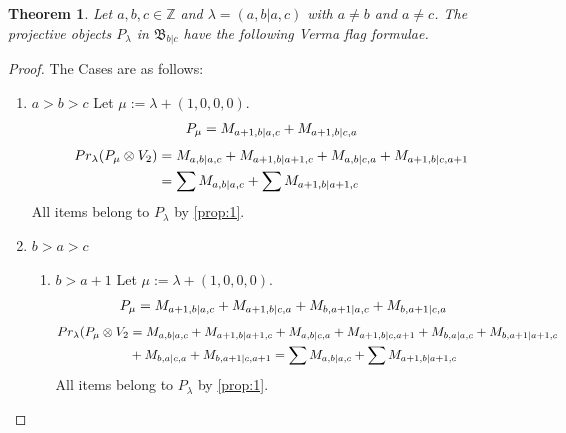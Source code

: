 \documentclass[12pt,a4paper]{article}
\newtheorem{theorem}{Theorem}[section]
\begin{document}
\begin{theorem}
  Let $a,b,c \in \mathbb{Z}$ and $\lambda = (a,b|a,c)$ with $a \neq b$ and $a \neq c$. The projective objects $P_{\lambda}$ in $\mathfrak{B}_{b|c}$ have the following Verma flag formulae.
\end{theorem}
\begin{proof} The Cases are as follows:\par
\begin{enumerate}

\item $a>b>c$
        Let $\mu:=\lambda + (1,0,0,0) $. 
\begin{equation}\notag
  \begin{aligned}
      P_{\mu} =
M_{a+1,b|a,c}
+M_{a+1,b|c,a}
  \end{aligned}
\end{equation}
\begin{equation}\notag
  \begin{aligned}
  Pr_{\lambda}(P_\mu \otimes V_2) &=
M_{a,b|a,c}
+M_{a+1,b|a+1,c}
+M_{a,b|c,a}
+M_{a+1,b|c,a+1} \\
                                  &=
\sum M_{a,b|a,c}
+\sum M_{a+1,b|a+1,c}
  \end{aligned}
\end{equation}
All items belong to $P_\lambda$ by \cref{prop:1}.

\item $b>a>c$
  \begin{enumerate}
    \item $b>a+1$
        Let $\mu:=\lambda + (1,0,0,0) $. 
\begin{equation}\notag
  \begin{aligned}
      P_{\mu} =
M_{a+1,b|a,c}
+M_{a+1,b|c,a}
+M_{b,a+1|a,c}
+M_{b,a+1|c,a}
  \end{aligned}
\end{equation}
\begin{equation}\notag
  \begin{aligned}
  Pr_{\lambda}(P_\mu \otimes V_2 &=
M_{a,b|a,c}
+M_{a+1,b|a+1,c}
+M_{a,b|c,a}
+M_{a+1,b|c,a+1}
+M_{b,a|a,c}
+M_{b,a+1|a+1,c} \\
                                 &+
M_{b,a|c,a}
+M_{b,a+1|c,a+1}
                                 =
\sum M_{a,b|a,c}
+\sum M_{a+1,b|a+1,c}
  \end{aligned}
\end{equation}
All items belong to $P_\lambda$ by \cref{prop:1}.
    

\end{enumerate}
\end{enumerate}
\end{proof}
\end{document}
